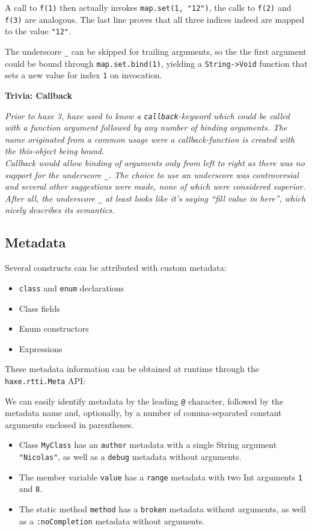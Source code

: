 \documentclass{article}
\newcommand{\type}[1]{\texttt{#1}}
\newcommand{\expr}[1]{\texttt{#1}}
\newenvironment{myshaded}
  {\def\FrameCommand{\fboxsep=\topsep\colorbox{bgcolor}}%
  \MakeFramed {\advance\hsize-\width \FrameRestore}}%
 {\endMakeFramed}
\newcommand{\trivia}[2]
	{\begin{myshaded}\noindent\textbf{Trivia: #1}\par\nobreak\noindent\ignorespaces\textit{#2}\end{myshaded}}
\begin{document}
A call to \expr{f(1)} then actually invokes \expr{map.set(1, "12")}, the calls to \expr{f(2)} and \expr{f(3)} are analogous. The last line proves that all three indices indeed are mapped to the value \expr{"12"}.

The underscore \expr{_} can be skipped for trailing arguments, so the the first argument could be bound through \expr{map.set.bind(1)}, yielding a \expr{String->Void} function that sets a new value for index \expr{1} on invocation.

\trivia{Callback}{Prior to haxe 3, haxe used to know a \expr{callback}-keyword which could be called with a function argument followed by any number of binding arguments. The name originated from a common usage were a callback-function is created with the this-object being bound.\\
Callback would allow binding of arguments only from left to right as there was no support for the underscore \expr{_}. The choice to use an underscore was controversial and several other suggestions were made, none of which were considered superior. After all, the underscore \expr{_} at least looks like it's saying ``fill value in here'', which nicely describes its semantics.}



\subsection{Metadata}

Several constructs can be attributed with custom metadata:

\begin{itemize}
	\item \expr{class} and \expr{enum} declarations
	\item Class fields
	\item Enum constructors
	\item Expressions
\end{itemize}

These metadata information can be obtained at runtime through the \type{haxe.rtti.Meta} API:



We can easily identify metadata by the leading \expr{@} character, followed by the metadata name and, optionally, by a number of comma-separated constant arguments enclosed in parentheses.

\begin{itemize}
	\item Class \type{MyClass} has an \expr{author} metadata with a single String argument \expr{"Nicolas"}, as well as a \expr{debug} metadata without arguments.
	\item The member variable \expr{value} has a \expr{range} metadata with two Int arguments \expr{1} and \expr{8}.
	\item The static method \expr{method} has a \expr{broken} metadata without arguments, as well as a \expr{:noCompletion} metadata without arguments.
\end{itemize}
\end{document}
